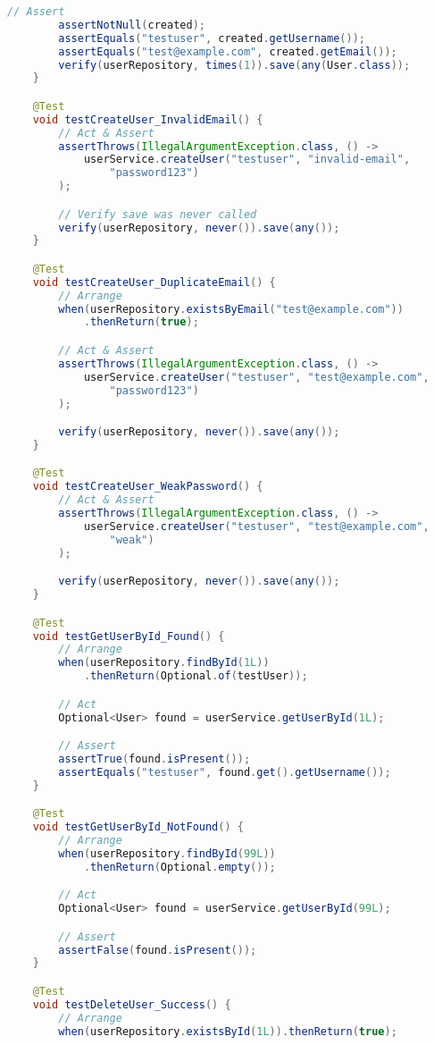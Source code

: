 \documentclass[12pt,a4paper]{article}
\begin{document}
\begin{lstlisting}[language=java, caption=UserServiceTest.java - Unit Tests with Mockito]
        // Assert
        assertNotNull(created);
        assertEquals("testuser", created.getUsername());
        assertEquals("test@example.com", created.getEmail());
        verify(userRepository, times(1)).save(any(User.class));
    }

    @Test
    void testCreateUser_InvalidEmail() {
        // Act & Assert
        assertThrows(IllegalArgumentException.class, () ->
            userService.createUser("testuser", "invalid-email",
                "password123")
        );

        // Verify save was never called
        verify(userRepository, never()).save(any());
    }

    @Test
    void testCreateUser_DuplicateEmail() {
        // Arrange
        when(userRepository.existsByEmail("test@example.com"))
            .thenReturn(true);

        // Act & Assert
        assertThrows(IllegalArgumentException.class, () ->
            userService.createUser("testuser", "test@example.com",
                "password123")
        );

        verify(userRepository, never()).save(any());
    }

    @Test
    void testCreateUser_WeakPassword() {
        // Act & Assert
        assertThrows(IllegalArgumentException.class, () ->
            userService.createUser("testuser", "test@example.com",
                "weak")
        );

        verify(userRepository, never()).save(any());
    }

    @Test
    void testGetUserById_Found() {
        // Arrange
        when(userRepository.findById(1L))
            .thenReturn(Optional.of(testUser));

        // Act
        Optional<User> found = userService.getUserById(1L);

        // Assert
        assertTrue(found.isPresent());
        assertEquals("testuser", found.get().getUsername());
    }

    @Test
    void testGetUserById_NotFound() {
        // Arrange
        when(userRepository.findById(99L))
            .thenReturn(Optional.empty());

        // Act
        Optional<User> found = userService.getUserById(99L);

        // Assert
        assertFalse(found.isPresent());
    }

    @Test
    void testDeleteUser_Success() {
        // Arrange
        when(userRepository.existsById(1L)).thenReturn(true);


\end{lstlisting}
\end{document}
